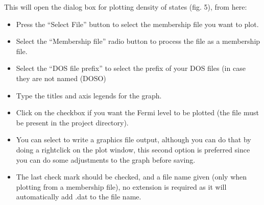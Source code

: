 \documentclass[letterpaper,10pt,english,openany,oneside]{sphinxmanual}
\begin{document}
\sphinxAtStartPar
This will open the dialog box for plotting density of states (fig. 5), from here:
\begin{itemize}
\item {} 
\sphinxAtStartPar
Press the “Select File” button to select the membership file you want to plot.

\item {} 
\sphinxAtStartPar
Select the “Membership file” radio button to process the file as a membership file.

\item {} 
\sphinxAtStartPar
Select the “DOS file prefix” to select the prefix of your DOS files (in case they are not named (DOSO)

\item {} 
\sphinxAtStartPar
Type the titles and axis legends for the graph.

\item {} 
\sphinxAtStartPar
Click on the checkbox if you want the Fermi level to be plotted (the file  must be present in the project directory).

\item {} 
\sphinxAtStartPar
You can select to write a graphics file output, although you can do that by doing a right\sphinxhyphen{}click on the plot window, this second option is preferred since you can do some adjustments to the graph before saving.

\item {} 
\sphinxAtStartPar
The last check mark  should be checked, and a file name given (only when plotting from a membership file), no extension is required as it will automatically add .dat to the file name.

\end{itemize}

\begin{figure}[htbp]
\centering

\noindent{}
\end{figure}
\end{document}

